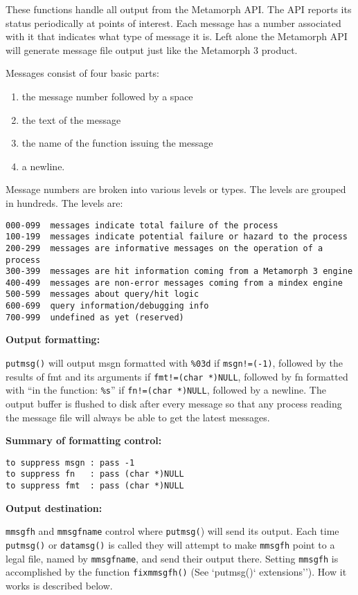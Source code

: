 These functions handle all output from the Metamorph API.  The API
reports its status periodically at points of interest.  Each
message has a number associated with it that indicates what type
of message it is.  Left alone the Metamorph API will generate
message file output just like the Metamorph 3 product.

Messages consist of four basic parts:
\begin{enumerate}
\item the message number followed by a space
\item the text of the message
\item the name of the function issuing the message
\item a newline.
\end{enumerate}

Message numbers are broken into various levels or types.  The levels
are grouped in hundreds.  The levels are:
\begin{verbatim}
000-099  messages indicate total failure of the process
100-199  messages indicate potential failure or hazard to the process
200-299  messages are informative messages on the operation of a process
300-399  messages are hit information coming from a Metamorph 3 engine
400-499  messages are non-error messages coming from a mindex engine
500-599  messages about query/hit logic
600-699  query information/debugging info
700-999  undefined as yet (reserved)

\end{verbatim}

{\bf Output formatting:}

\verb`putmsg()` will output msgn formatted with \verb`%03d` if \verb`msgn!=(-1)`,
followed by the results of fmt and its arguments if
\verb`fmt!=(char *)NULL`, followed by fn formatted with ``in the
function:  \verb`%s`'' if \verb`fn!=(char *)NULL`, followed by a newline.  The
output buffer is flushed to disk after every message so that any
process reading the message file will always be able to get the
latest messages.

{\bf Summary of formatting control:}
\begin{verbatim}
to suppress msgn : pass -1
to suppress fn   : pass (char *)NULL
to suppress fmt  : pass (char *)NULL

\end{verbatim}

{\bf Output destination:}

\verb`mmsgfh` and \verb`mmsgfname` control where \verb`putmsg(`) will send its output.
Each time \verb`putmsg()` or \verb`datamsg()` is called they will attempt to
make \verb`mmsgfh` point to a legal file, named by \verb`mmsgfname`, and send
their output there.  Setting \verb`mmsgfh` is accomplished by the
function \verb`fixmmsgfh()` (See \verb```putmsg()` extensions'').  How it works is
described below.


